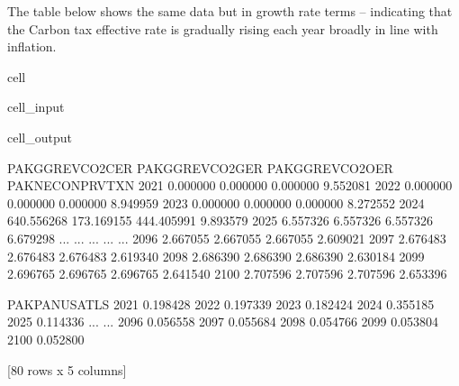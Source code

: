 \documentclass[letterpaper,10pt,english]{jupyterBook}
\begin{document}
\sphinxAtStartPar
The table below shows the same data but in growth rate terms – indicating that the Carbon tax effective rate is gradually rising each year broadly in line with inflation.

\begin{sphinxuseclass}{cell}\begin{sphinxVerbatimInput}

\begin{sphinxuseclass}{cell_input}
\begin{sphinxVerbatim}[commandchars=\\\{\}]
\PYG{p}{[}\PYG{p}{]}
\end{sphinxVerbatim}

\end{sphinxuseclass}\end{sphinxVerbatimInput}
\begin{sphinxVerbatimOutput}

\begin{sphinxuseclass}{cell_output}
\begin{sphinxVerbatim}[commandchars=\\\{\}]
      PAKGGREVCO2CER  PAKGGREVCO2GER  PAKGGREVCO2OER  PAKNECONPRVTXN  \PYGZbs{}
2021        0.000000        0.000000        0.000000        9.552081   
2022        0.000000        0.000000        0.000000        8.949959   
2023        0.000000        0.000000        0.000000        8.272552   
2024     \PYGZhy{}640.556268     \PYGZhy{}173.169155     \PYGZhy{}444.405991        9.893579   
2025        6.557326        6.557326        6.557326        6.679298   
...              ...             ...             ...             ...   
2096        2.667055        2.667055        2.667055        2.609021   
2097        2.676483        2.676483        2.676483        2.619340   
2098        2.686390        2.686390        2.686390        2.630184   
2099        2.696765        2.696765        2.696765        2.641540   
2100        2.707596        2.707596        2.707596        2.653396   

      PAKPANUSATLS  
2021     \PYGZhy{}0.198428  
2022     \PYGZhy{}0.197339  
2023     \PYGZhy{}0.182424  
2024     \PYGZhy{}0.355185  
2025     \PYGZhy{}0.114336  
...            ...  
2096      0.056558  
2097      0.055684  
2098      0.054766  
2099      0.053804  
2100      0.052800  

[80 rows x 5 columns]
\end{sphinxVerbatim}

\end{sphinxuseclass}\end{sphinxVerbatimOutput}

\end{sphinxuseclass}
\end{document}
